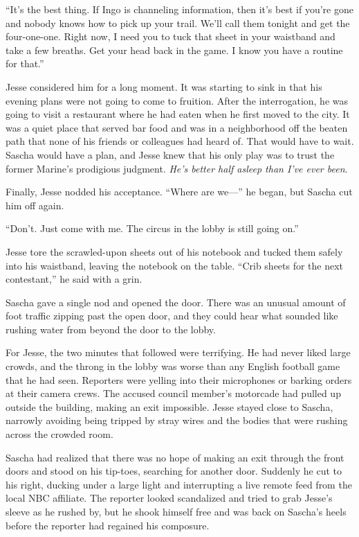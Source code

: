 \documentclass[12pt]{book}
\begin{document}
``It's the best thing.  If Ingo is channeling information, then it's best if you're gone and nobody knows how to pick up your trail.  We'll call them tonight and get the four-one-one.  Right now, I need you to tuck that sheet in your waistband and take a few breaths.  Get your head back in the game.  I know you have a routine for that.''

Jesse considered him for a long moment.  It was starting to sink in that his evening plans were not going to come to fruition.  After the interrogation, he was going to visit a restaurant where he had eaten when he first moved to the city.  It was a quiet place that served bar food and was in a neighborhood off the beaten path that none of his friends or colleagues had heard of.  That would have to wait.  Sascha would have a plan, and Jesse knew that his only play was to trust the former Marine's prodigious judgment.  \emph{He's better half asleep than I've ever been}.

Finally, Jesse nodded his acceptance.  ``Where are we---'' he began, but Sascha cut him off again.

``Don't.  Just come with me.  The circus in the lobby is still going on.''

Jesse tore the scrawled-upon sheets out of his notebook and tucked them safely into his waistband, leaving the notebook on the table.  ``Crib sheets for the next contestant,'' he said with a grin.

Sascha gave a single nod and opened the door.  There was an unusual amount of foot traffic zipping past the open door, and they could hear what sounded like rushing water from beyond the door to the lobby.

For Jesse, the two minutes that followed were terrifying.  He had never liked large crowds, and the throng in the lobby was worse than any English football game that he had seen.  Reporters were yelling into their microphones or barking orders at their camera crews.  The accused council member's motorcade had pulled up outside the building, making an exit impossible.  Jesse stayed close to Sascha, narrowly avoiding being tripped by stray wires and the bodies that were rushing across the crowded room.

Sascha had realized that there was no hope of making an exit through the front doors and stood on his tip-toes, searching for another door.  Suddenly he cut to his right, ducking under a large light and interrupting a live remote feed from the local NBC affiliate.  The reporter looked scandalized and tried to grab Jesse's sleeve as he rushed by, but he shook himself free and was back on Sascha's heels before the reporter had regained his composure.
\end{document}
